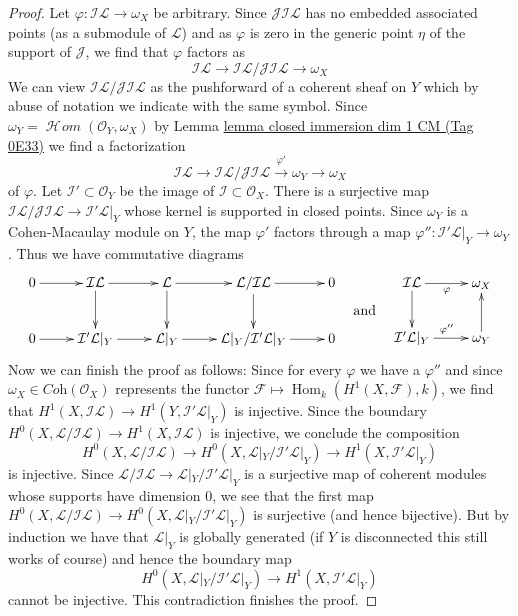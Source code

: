 \documentclass{amsart}
\theoremstyle{plain}
\theoremstyle{definition}
\theoremstyle{remark}
\numberwithin{equation}{subsection}
\def\Hom{\mathop{\mathrm{Hom}}\nolimits}
\def\SheafHom{\mathop{\mathcal{H}\!\mathit{om}}\nolimits}
\begin{document}
\begin{proof}
\medskip\noindent
Let $\varphi : \mathcal{I}\mathcal{L} \to \omega_X$ be arbitrary.
Since $\mathcal{J}\mathcal{I}\mathcal{L}$
has no embedded associated points
(as a submodule of $\mathcal{L}$) and as $\varphi$ is zero
in the generic point $\eta$ of the support of $\mathcal{J}$, we find that
$\varphi$ factors as
$$
\mathcal{I}\mathcal{L} \to
\mathcal{I}\mathcal{L}/\mathcal{J}\mathcal{I}\mathcal{L} \to \omega_X
$$
We can view $\mathcal{I}\mathcal{L}/\mathcal{J}\mathcal{I}\mathcal{L}$
as the pushforward of a coherent sheaf on $Y$ which by abuse of
notation we indicate with the same symbol.
Since $\omega_Y = \SheafHom(\mathcal{O}_Y, \omega_X)$
by Lemma \href{https://stacks.math.columbia.edu/tag/0E33}{lemma closed immersion dim 1 CM (Tag 0E33)}
we find a factorization
$$
\mathcal{I}\mathcal{L} \to
\mathcal{I}\mathcal{L}/
\mathcal{J}\mathcal{I}\mathcal{L} 
\xrightarrow{\varphi'} \omega_Y \to \omega_X
$$
of $\varphi$. Let $\mathcal{I}' \subset \mathcal{O}_Y$ be the
image of $\mathcal{I} \subset \mathcal{O}_X$. There is a surjective map
$\mathcal{I}\mathcal{L}/\mathcal{J}\mathcal{I}\mathcal{L} \to
\mathcal{I}'\mathcal{L}|_Y$ whose kernel is supported in closed points.
Since $\omega_Y$ is a Cohen-Macaulay module on $Y$, the map $\varphi'$
factors through a map
$\varphi'' : \mathcal{I}'\mathcal{L}|_Y \to \omega_Y$.
Thus we have commutative diagrams
$$
\vcenter{
\xymatrix{
0 \ar[r] &
\mathcal{I}\mathcal{L} \ar[r] \ar[d] &
\mathcal{L} \ar[r] \ar[d] &
\mathcal{L}/\mathcal{I}\mathcal{L} \ar[r] \ar[d] &
0 \\
0 \ar[r] &
\mathcal{I}'\mathcal{L}|_Y \ar[r] &
\mathcal{L}|_Y \ar[r] &
\mathcal{L}|_Y/\mathcal{I}'\mathcal{L}|_Y \ar[r] &
0
}
}
\quad\text{and}\quad
\vcenter{
\xymatrix{
\mathcal{I}\mathcal{L} \ar[r]_\varphi \ar[d] & \omega_X \\
\mathcal{I}'\mathcal{L}|_Y \ar[r]^{\varphi''} & \omega_Y \ar[u]
}
}
$$
Now we can finish the proof as follows:
Since for every $\varphi$ we have a $\varphi''$ and since
$\omega_X \in \textit{Coh}(\mathcal{O}_X)$
represents the functor $\mathcal{F} \mapsto \Hom_k(H^1(X, \mathcal{F}), k)$,
we find that
$H^1(X, \mathcal{I}\mathcal{L}) \to H^1(Y, \mathcal{I}'\mathcal{L}|_Y)$
is injective. Since the boundary
$H^0(X, \mathcal{L}/\mathcal{I}\mathcal{L}) \to H^1(X, \mathcal{I}\mathcal{L})$
is injective, we conclude the composition
$$
H^0(X, \mathcal{L}/\mathcal{I}\mathcal{L}) \to
H^0(X, \mathcal{L}|_Y/\mathcal{I}'\mathcal{L}|_Y) \to
H^1(X, \mathcal{I}'\mathcal{L}|_Y)
$$
is injective. Since
$\mathcal{L}/\mathcal{I}\mathcal{L} \to
\mathcal{L}|_Y/\mathcal{I}'\mathcal{L}|_Y$
is a surjective map of coherent modules whose supports have
dimension $0$, we see that the first map
$H^0(X, \mathcal{L}/\mathcal{I}\mathcal{L}) \to
H^0(X, \mathcal{L}|_Y/\mathcal{I}'\mathcal{L}|_Y)$
is surjective (and hence bijective).
But by induction we have that $\mathcal{L}|_Y$ is globally
generated (if $Y$ is disconnected this still works of course)
and hence the boundary map
$$
H^0(X, \mathcal{L}|_Y/\mathcal{I}'\mathcal{L}|_Y) \to
H^1(X, \mathcal{I}'\mathcal{L}|_Y)
$$
cannot be injective.
This contradiction finishes the proof.
\end{proof}
\end{document}
